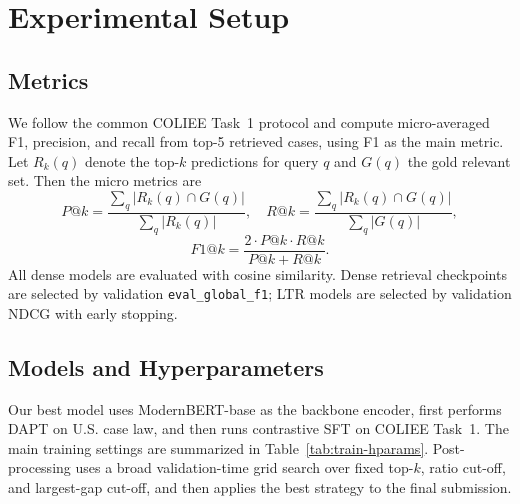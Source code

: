\section{Experimental Setup}

\subsection{Metrics}

We follow the common COLIEE Task~1 protocol and compute micro-averaged F1, precision, and recall from top-5 retrieved cases, using F1 as the main metric. Let $R_k(q)$ denote the top-$k$ predictions for query $q$ and $G(q)$ the gold relevant set. Then the micro metrics are
\begin{equation}
P@k=
\frac{\sum_q |R_k(q)\cap G(q)|}
{\sum_q |R_k(q)|},
\quad
R@k=
\frac{\sum_q |R_k(q)\cap G(q)|}
{\sum_q |G(q)|},
\end{equation}
\begin{equation}
F1@k=\frac{2 \cdot P@k \cdot R@k}{P@k+R@k}.
\end{equation}
All dense models are evaluated with cosine similarity. Dense retrieval checkpoints are selected by validation \texttt{eval\_global\_f1}; LTR models are selected by validation NDCG with early stopping.

\subsection{Models and Hyperparameters}

Our best model uses ModernBERT-base as the backbone encoder, first performs DAPT on U.S. case law, and then runs contrastive SFT on COLIEE Task~1. The main training settings are summarized in Table~\ref{tab:train-hparams}. Post-processing uses a broad validation-time grid search over fixed top-$k$, ratio cut-off, and largest-gap cut-off, and then applies the best strategy to the final submission.

